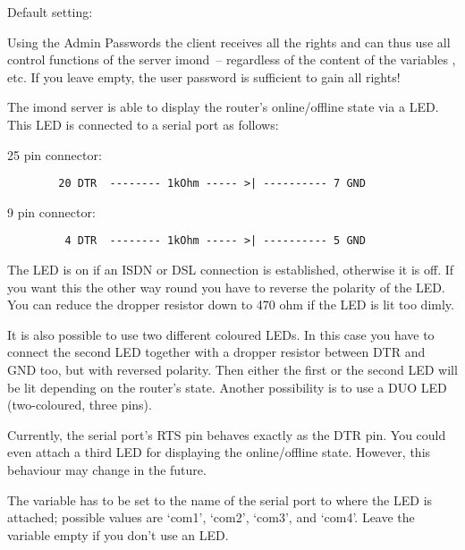 \begin{description}

    Default setting: 

    {Using the Admin Passwords the client receives all the rights and
    can thus use all control functions of the server imond~-- regardless 
    of the content of the variables ,  etc.
    If you leave  empty, the user password is
    sufficient to gain all rights!
    }


    {The imond server is able to display the router's online/offline state via
     a LED. This LED is connected to a serial port as follows:

      25 pin connector:

\begin{example}
\begin{verbatim}
        20 DTR  -------- 1kOhm ----- >| ---------- 7 GND
\end{verbatim}
\end{example}


      9 pin connector:
\begin{example}
\begin{verbatim}
         4 DTR  -------- 1kOhm ----- >| ---------- 5 GND
\end{verbatim}
\end{example}

      The LED is on if an ISDN or DSL connection is established, otherwise
      it is off. If you want this the other way round you have to reverse the polarity of
      the LED. You can reduce the dropper resistor down to 470 ohm if the LED
      is lit too dimly.

      It is also possible to use two different coloured LEDs. In this
      case you have to connect the second LED together with a dropper
      resistor between DTR and GND too, but with reversed polarity. Then either the
      first or the second LED will be lit depending on the router's state.
      Another possibility is to use a DUO LED (two-coloured, three pins).

      Currently, the serial port's RTS pin behaves exactly as the DTR pin.
      You could even attach a third LED for displaying the
      online/offline state. However, this behaviour may change in the future.

      The variable  has to be set to the name of the serial
      port to where the LED is attached; possible values are `com1', `com2',
      `com3', and `com4'. Leave the variable empty if you don't use an LED.}



\end{description}

